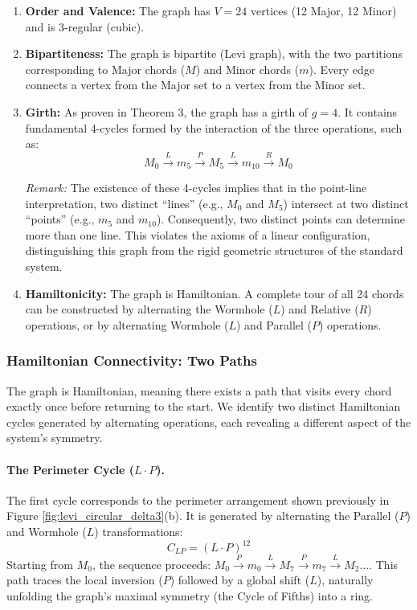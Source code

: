 \documentclass[12pt,letterpaper]{amsart}
\begin{document}
\begin{enumerate}
    \item \textbf{Order and Valence:} The graph has $V=24$ vertices (12 Major, 12 Minor) and is $3$-regular (cubic).
    
    \item \textbf{Bipartiteness:} The graph is bipartite (Levi graph), with the two partitions corresponding to Major chords ($M$) and Minor chords ($m$). Every edge connects a vertex from the Major set to a vertex from the Minor set.
    
    \item \textbf{Girth:} As proven in Theorem 3, the graph has a girth of $g=4$. It contains fundamental 4-cycles formed by the interaction of the three operations, such as:
    \[ M_0 \xrightarrow{L} m_5 \xrightarrow{P} M_5 \xrightarrow{L} m_{10} \xrightarrow{R} M_0 \]
    
    \textit{Remark:} The existence of these 4-cycles implies that in the point-line interpretation, two distinct ``lines'' (e.g., $M_0$ and $M_5$) intersect at two distinct ``points'' (e.g., $m_5$ and $m_{10}$). Consequently, two distinct points can determine more than one line. This violates the axioms of a linear configuration, distinguishing this graph from the rigid geometric structures of the standard system.
    
    \item \textbf{Hamiltonicity:} The graph is Hamiltonian. A complete tour of all 24 chords can be constructed by alternating the Wormhole ($L$) and Relative ($R$) operations, or by alternating Wormhole ($L$) and Parallel ($P$) operations.
\end{enumerate}



\subsubsection{Hamiltonian Connectivity: Two Paths}
The graph is Hamiltonian, meaning there exists a path that visits every chord exactly once before returning to the start. We identify two distinct Hamiltonian cycles generated by alternating operations, each revealing a different aspect of the system's symmetry.

\paragraph{The Perimeter Cycle ($L \cdot P$).}
The first cycle corresponds to the perimeter arrangement shown previously in Figure \ref{fig:levi_circular_delta3}(b). It is generated by alternating the Parallel ($P$) and Wormhole ($L$) transformations:
\[ C_{LP} = (L \cdot P)^{12} \]
Starting from $M_0$, the sequence proceeds: $M_0 \xrightarrow{P} m_0 \xrightarrow{L} M_7 \xrightarrow{P} m_7 \xrightarrow{L} M_2 \dots$. This path traces the local inversion ($P$) followed by a global shift ($L$), naturally unfolding the graph's maximal symmetry (the Cycle of Fifths) into a ring.
\end{document}
